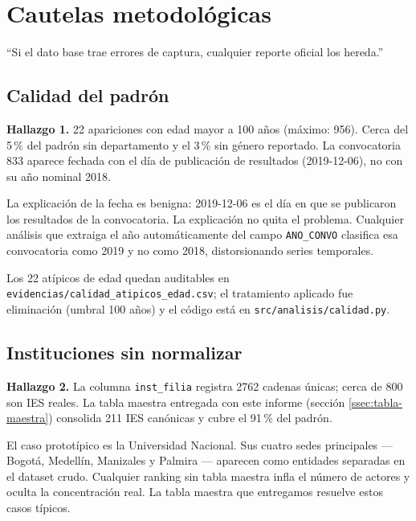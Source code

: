 \documentclass[11pt,a4paper,oneside]{article}
\begin{document}
\newpage

\section{Cautelas metodológicas}\label{sec:calidad}

\epigraph{``Si el dato base trae errores de captura, cualquier reporte oficial los hereda.''}{}

\subsection{Calidad del padrón}\label{ssec:h1}

\begin{hallazgo}
\textbf{Hallazgo 1.} 22 apariciones con edad mayor a 100 años (máximo: 956). Cerca del 5\,\% del padrón sin departamento y el 3\,\% sin género reportado. La convocatoria 833 aparece fechada con el día de publicación de resultados (2019-12-06), no con su año nominal 2018.
\end{hallazgo}

La explicación de la fecha es benigna: 2019-12-06 es el día en que se publicaron los resultados de la convocatoria. La explicación no quita el problema. Cualquier análisis que extraiga el año automáticamente del campo \texttt{ANO\_CONVO} clasifica esa convocatoria como 2019 y no como 2018, distorsionando series temporales.

Los 22 atípicos de edad quedan auditables en \texttt{evidencias/calidad\_atipicos\_edad.csv}; el tratamiento aplicado fue eliminación (umbral 100 años) y el código está en \texttt{src/analisis/calidad.py}.

\subsection{Instituciones sin normalizar}\label{ssec:h2}

\begin{hallazgo}
\textbf{Hallazgo 2.} La columna \texttt{inst\_filia} registra \num{2762} cadenas únicas; cerca de \num{800} son IES reales. La tabla maestra entregada con este informe (sección \ref{ssec:tabla-maestra}) consolida 211 IES canónicas y cubre el 91\,\% del padrón.
\end{hallazgo}

El caso prototípico es la Universidad Nacional. Sus cuatro sedes principales --- Bogotá, Medellín, Manizales y Palmira --- aparecen como entidades separadas en el dataset crudo. Cualquier ranking sin tabla maestra infla el número de actores y oculta la concentración real. La tabla maestra que entregamos resuelve estos casos típicos.
\end{document}
